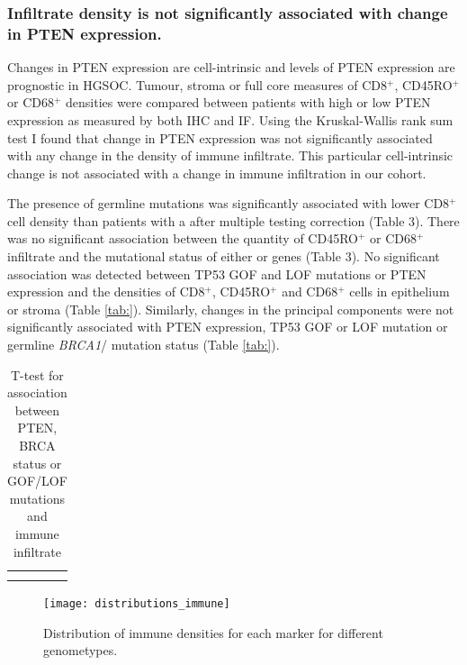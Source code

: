 \subsubsection{Infiltrate density is not significantly associated with change in PTEN expression.}
Changes in PTEN expression are cell-intrinsic and levels of PTEN expression are prognostic in HGSOC\cite{RN17, RN15}. Tumour, stroma or full core measures of CD8$^+$, CD45RO$^+$ or CD68$^+$ densities were compared between patients with high or low PTEN expression as measured by both IHC and IF. Using the Kruskal-Wallis rank sum test I found that change in PTEN expression was not significantly associated with any change in the density of immune infiltrate. This particular cell-intrinsic change is not associated with a change in immune infiltration in our cohort.

The presence of germline  mutations was significantly associated with lower CD8$^+$ cell density than patients with a  after multiple testing correction (Table 3). There was no significant association between the quantity of CD45RO$^+$ or CD68$^+$ infiltrate and the mutational status of either  or  genes (Table 3). No significant association was detected between TP53 GOF and LOF mutations or PTEN expression and the densities of CD8$^+$, CD45RO$^+$ and CD68$^+$ cells in epithelium or stroma (Table \ref{tab:}). Similarly, changes in the principal components were not significantly associated with PTEN expression, TP53 GOF or LOF mutation or germline \textit{BRCA1}/ mutation status (Table \ref{tab:}). 

\begin{table}[]
    \centering
    \begin{tabular}{c|c}
         &  \\
         & 
    \end{tabular}
    \caption{T-test for association between PTEN, BRCA status or GOF/LOF mutations and immune infiltrate }
    \label{tab:my_label}
\end{table}

\begin{figure}
    \centering
    \texttt{[image: distributions\_immune]}
    \caption{Distribution of immune densities for each marker for different genometypes.}
    \label{fig:immune_genome}
\end{figure}

\clearpage

